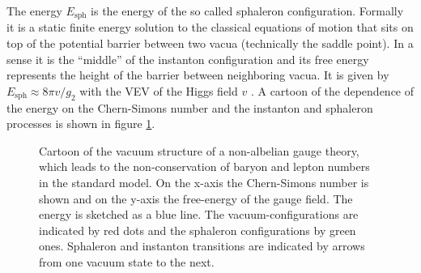 \documentclass[13pt,a4paper,titlepage]{article}
\begin{document}
The energy $E_{\mathrm{sph}}$ is the energy of the so called sphaleron configuration. Formally it is a static finite energy solution to the classical
equations of motion that sits on top of the potential barrier between two vacua (technically the saddle point). In a sense it is the ``middle'' of the instanton configuration and its free energy represents the height of the barrier between
neighboring vacua.
It is given by $E_{\mathrm{sph}} \approx 8\pi v / g_2$ with the VEV of the Higgs field $v$ \cite[eq. 4.5]{Cline:2006ts_Baryogenesis}.
A cartoon of the dependence of the energy on the Chern-Simons number and the instanton and sphaleron processes is shown in figure \ref{fig:sphaleron_cartoon}.
\begin{figure}[H]
    \centering
    \caption{Cartoon of the vacuum structure of a non-albelian gauge theory, which leads to the non-conservation of baryon and lepton numbers in the standard model.
    On the x-axis the Chern-Simons number is shown and on the y-axis the free-energy of the gauge field.
    The energy is sketched as a blue line. The vacuum-configurations are indicated by red dots and the sphaleron configurations by green ones. Sphaleron and instanton transitions are indicated by arrows from one vacuum state
    to the next.
    }
    \label{fig:sphaleron_cartoon}
\end{figure}
\end{document}
